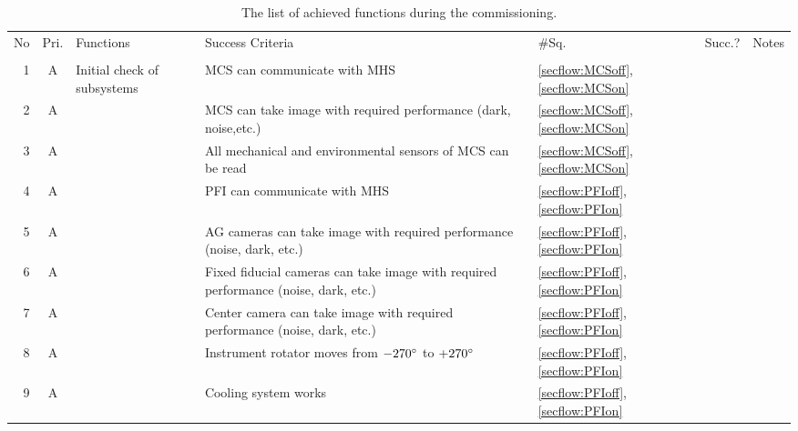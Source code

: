 

\begin{landscape}
\begin{longtable}{r|c|p{45mm}|p{80mm}|p{11mm}|c|p{35mm}}
\caption{
The list of achieved functions during the commissioning.}
\label{tbl:funcs} 
\footnotesize
\\ \hline
No	& Pri.	& Functions & Success Criteria & \#Sq.  & Succ.?  & Notes \\ \hline \hline
\endhead
\endfoot
\multicolumn{7}{l}{\hspace{5mm} {\bf Fiber Allocation}} \\ \hline
1	& A 	& Initial check of subsystems	& MCS can communicate with MHS	& \ref{secflow:MCSoff}, \ref{secflow:MCSon}	&	& 	\\ \cline{1-2}\cline{4-7}
2	& A 	&	& MCS can take image with required performance (dark, noise,etc.)	& \ref{secflow:MCSoff}, \ref{secflow:MCSon}	&	& 	\\ \cline{1-2}\cline{4-7}
3	& A 	& 	& All mechanical and environmental sensors of MCS can be read	& \ref{secflow:MCSoff}, \ref{secflow:MCSon}	&	&	\\ \cline{1-2}\cline{4-7}
4	& A	&	& PFI can communicate with MHS	& \ref{secflow:PFIoff}, \ref{secflow:PFIon}	&	& \\ \cline{1-2}\cline{4-7}
5	& A	&	& AG cameras can take image with required performance (noise, dark, etc.)	& \ref{secflow:PFIoff}, \ref{secflow:PFIon}	&	& \\ \cline{1-2}\cline{4-7}
6	& A	&	& Fixed fiducial cameras can take image with required performance (noise, dark, etc.)	& \ref{secflow:PFIoff}, \ref{secflow:PFIon}	&	& \\ \cline{1-2}\cline{4-7}
7	& A	&	& Center camera can take image with required performance (noise, dark, etc.)	& \ref{secflow:PFIoff}, \ref{secflow:PFIon}	&	& \\ \cline{1-2}\cline{4-7}
8	& A	&	& Instrument rotator moves from $-270 ^\circ$ to $+270 ^\circ$	& \ref{secflow:PFIoff}, \ref{secflow:PFIon}	&	& \\ \cline{1-2}\cline{4-7}
9	& A	&	& Cooling system works	& \ref{secflow:PFIoff}, \ref{secflow:PFIon}	&	& \\ \cline{1-2}\cline{4-7}

\end{longtable}
\end{landscape}
